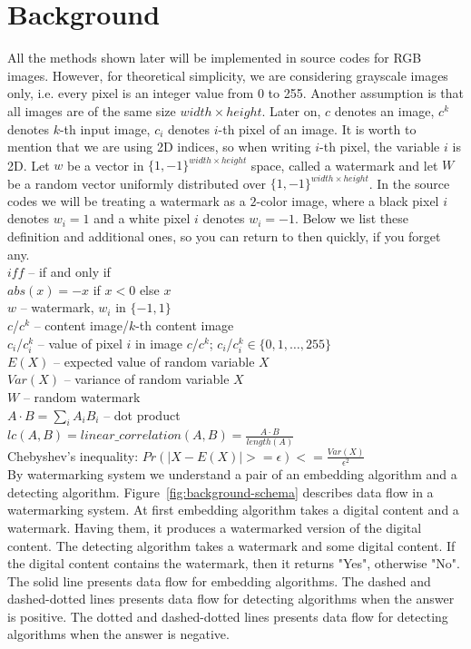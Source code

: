 \documentclass[a4paper,12pt]{article}
\begin{document}
\section{Background}
All the methods shown later will be implemented in source codes for RGB
images. However, for theoretical simplicity, we are considering
grayscale images only, i.e. every pixel is an integer value from 0 to 255.
Another assumption is that all images are of the same size
$width\times height$. Later on, $c$ denotes an image, $c^k$ denotes
$k$-th input image, $c_i$ denotes $i$-th pixel of an image. It is worth to
mention that we are using 2D indices, so when writing $i$-th pixel, the
variable $i$ is 2D. Let $w$ be a vector in
$\{1, -1\}^{width\times height}$ space, called a watermark and let $W$ be
a random vector uniformly distributed over $\{1, -1\}^{width\times height}$. In the source codes we will be treating
a watermark as a $2$-color image, where a black pixel $i$ denotes $w_i = 1$ and a
white pixel $i$ denotes $w_i = -1$. Below we list these definition and
additional ones, so you can return to then quickly, if you forget any.\\
\indent $iff$ -- if and only if\\
\indent $abs(x) = -x$ if $x < 0$ else $x$\\
\indent $w$ -- watermark, $w_i$ in $\{-1, 1\}$\\
\indent $c$/$c^k$ -- content image/$k$-th content image\\
\indent $c_i$/$c^k_i$ -- value of pixel $i$ in image $c$/$c^k$; $c_i$/$c^k_i \in \{0, 1, \ldots, 255\}$\\
\indent $E(X)$ -- expected value of random variable $X$\\
\indent $Var(X)$ -- variance of random variable $X$\\
\indent $W$ -- random watermark\\
\indent $A\cdot B = \sum_i A_i B_i$ -- dot product\\
\indent $lc(A, B) = linear\_correlation(A, B) = \frac{A\cdot B}{length(A)}$\\
\indent Chebyshev's inequality: $Pr(|X-E(X)| >= \epsilon) <= \frac{Var(X)}{\epsilon^2}$\\
By watermarking system we understand a pair of an embedding algorithm and
a detecting algorithm. Figure~\ref{fig:background-schema} describes data flow in
a watermarking system. At first embedding algorithm takes a digital content and
a watermark. Having them, it produces a watermarked version of the digital
content. The detecting algorithm takes a watermark and some digital content.
If the digital content contains the watermark, then it returns "Yes",
otherwise "No". The solid line presents data flow for embedding algorithms. The
dashed and dashed-dotted lines presents data flow for detecting algorithms when
the answer is positive. The dotted and dashed-dotted lines presents data flow
for detecting algorithms when the answer is negative.
\end{document}
